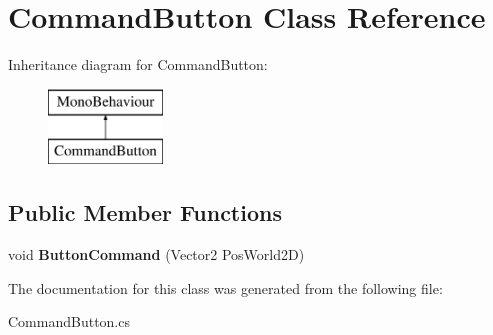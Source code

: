 \hypertarget{class_command_button}{}\section{Command\+Button Class Reference}
\label{class_command_button}
Inheritance diagram for Command\+Button\+:\begin{figure}[H]
\begin{center}
\leavevmode
\includegraphics[height=2.000000cm]{class_command_button}
\end{center}
\end{figure}
\subsection*{Public Member Functions}
\begin{DoxyCompactItemize}
\item 
\mbox{\label{class_command_button_a76a4cf105f8225511db815cbda5d93fe}} 
void {\bfseries Button\+Command} (Vector2 Pos\+World2D)
\end{DoxyCompactItemize}


The documentation for this class was generated from the following file\+:\begin{DoxyCompactItemize}
\item 
Command\+Button.\+cs\end{DoxyCompactItemize}
